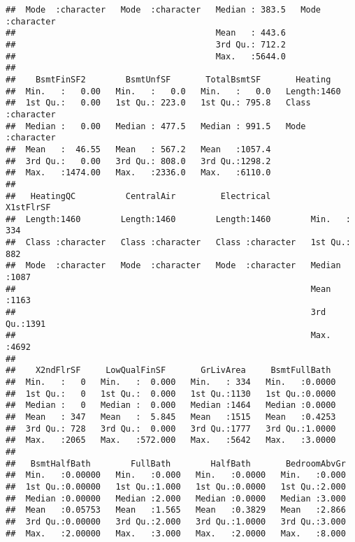 \documentclass[
]{article}
\begin{document}
\begin{verbatim}
##  Mode  :character   Mode  :character   Median : 383.5   Mode  :character  
##                                        Mean   : 443.6                     
##                                        3rd Qu.: 712.2                     
##                                        Max.   :5644.0                     
##                                                                           
##    BsmtFinSF2        BsmtUnfSF       TotalBsmtSF       Heating         
##  Min.   :   0.00   Min.   :   0.0   Min.   :   0.0   Length:1460       
##  1st Qu.:   0.00   1st Qu.: 223.0   1st Qu.: 795.8   Class :character  
##  Median :   0.00   Median : 477.5   Median : 991.5   Mode  :character  
##  Mean   :  46.55   Mean   : 567.2   Mean   :1057.4                     
##  3rd Qu.:   0.00   3rd Qu.: 808.0   3rd Qu.:1298.2                     
##  Max.   :1474.00   Max.   :2336.0   Max.   :6110.0                     
##                                                                        
##   HeatingQC          CentralAir         Electrical          X1stFlrSF   
##  Length:1460        Length:1460        Length:1460        Min.   : 334  
##  Class :character   Class :character   Class :character   1st Qu.: 882  
##  Mode  :character   Mode  :character   Mode  :character   Median :1087  
##                                                           Mean   :1163  
##                                                           3rd Qu.:1391  
##                                                           Max.   :4692  
##                                                                         
##    X2ndFlrSF     LowQualFinSF       GrLivArea     BsmtFullBath   
##  Min.   :   0   Min.   :  0.000   Min.   : 334   Min.   :0.0000  
##  1st Qu.:   0   1st Qu.:  0.000   1st Qu.:1130   1st Qu.:0.0000  
##  Median :   0   Median :  0.000   Median :1464   Median :0.0000  
##  Mean   : 347   Mean   :  5.845   Mean   :1515   Mean   :0.4253  
##  3rd Qu.: 728   3rd Qu.:  0.000   3rd Qu.:1777   3rd Qu.:1.0000  
##  Max.   :2065   Max.   :572.000   Max.   :5642   Max.   :3.0000  
##                                                                  
##   BsmtHalfBath        FullBath        HalfBath       BedroomAbvGr  
##  Min.   :0.00000   Min.   :0.000   Min.   :0.0000   Min.   :0.000  
##  1st Qu.:0.00000   1st Qu.:1.000   1st Qu.:0.0000   1st Qu.:2.000  
##  Median :0.00000   Median :2.000   Median :0.0000   Median :3.000  
##  Mean   :0.05753   Mean   :1.565   Mean   :0.3829   Mean   :2.866  
##  3rd Qu.:0.00000   3rd Qu.:2.000   3rd Qu.:1.0000   3rd Qu.:3.000  
##  Max.   :2.00000   Max.   :3.000   Max.   :2.0000   Max.   :8.000  

\end{verbatim}
\end{document}
